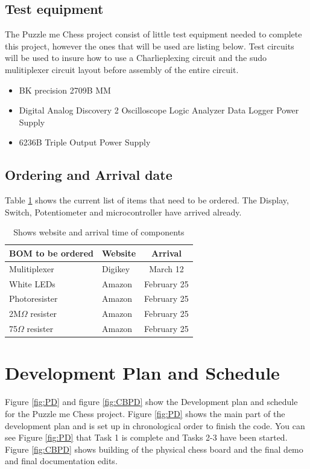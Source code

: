 \documentclass[11pt]{article}
\begin{document}
\subsection{Test equipment}
The Puzzle me Chess project consist of little test equipment needed to complete this project, however the ones that will be used are listing below. Test circuits will be used to insure how to use a Charlieplexing circuit and the sudo mulitiplexer circuit layout before assembly of the entire circuit. 
\begin{itemize}
\item BK precision 2709B MM
\item Digital Analog Discovery 2
\subitem Oscilloscope
\subitem Logic Analyzer
\subitem Data Logger
\subitem Power Supply
\item 6236B Triple Output Power Supply 

\end{itemize}

\subsection{Ordering  and Arrival date}
Table \ref{tab:ording} shows the current list of items that need to be ordered. The Display, Switch, Potentiometer and microcontroller have arrived already. 

\begin{table}[H]
\begin{center}
    \begin{tabular}{| l | l | c |}
    \hline
    BOM to be ordered  & Website & Arrival \\ \hline
    Mulitiplexer & Digikey & March 12 \\ \hline 
    White LEDs & Amazon & February 25 \\ \hline
    Photoresister & Amazon & February 25 \\ \hline
    2M$\Omega$ resister & Amazon & February 25 \\ \hline
    75$\Omega$ resister & Amazon  & February 25 \\ \hline
    \end{tabular}
    \caption{Shows website and arrival time of components}
	\label{tab:ording}
\end{center}
\end{table}

\section{Development Plan and Schedule}
Figure \ref{fig:PD} and figure \ref{fig:CBPD} show the Development plan and schedule for the Puzzle me Chess project. Figure \ref{fig:PD} shows the main part of the development plan and is set up in chronological order to finish the code. You can see Figure \ref{fig:PD} that Task 1 is complete and Tasks 2-3 have been started. Figure \ref{fig:CBPD} shows building of the physical chess board and the final demo and final documentation edits. 
\end{document}
